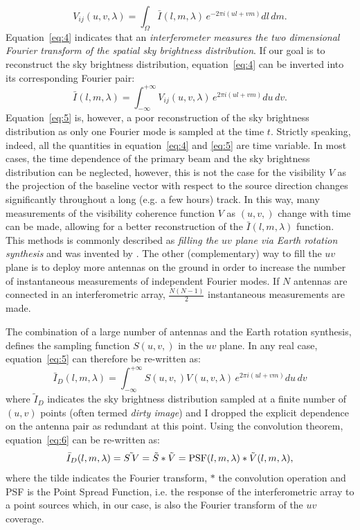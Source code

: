 \begin{equation}
V_{ij} (u,v, \lambda) = \int_\Omega {\bar I} (l, m, \lambda) \, e^{-2 \pi i (ul + vm)} dl \, dm.
\label{eq:4}
\end{equation}
Equation~\ref{eq:4} indicates that an {\it interferometer measures the two dimensional Fourier transform of the spatial sky brightness distribution}. If our goal is to reconstruct the sky brightness distribution, equation~\ref{eq:4} can be inverted into its corresponding Fourier pair:
\begin{equation}
{\bar I} (l, m, \lambda) = \int_{- \infty}^{+ \infty} V_{ij} (u,v, \lambda) \, e^{2 \pi i (ul + vm)} du \, dv.
\label{eq:5}
\end{equation}
Equation~\ref{eq:5} is, however, a poor reconstruction of the sky brightness distribution as only one Fourier mode is sampled at the time $t$. Strictly speaking, indeed, all the quantities in equation~\ref{eq:4} and \ref{eq:5} are time variable. In most cases, the time dependence of the primary beam and the sky brightness distribution can be neglected, however, this is not the case for the visibility $V$ as the projection of the baseline vector with respect to the source direction changes significantly throughout a long (e.g. a few hours) track. In this way, many measurements of the visibility coherence function $V$ as $(u,v,)$ change with time can be made, allowing for a better reconstruction of the ${\bar I} (l, m, \lambda)$ function. This methods is commonly described as {\it filling the $uv$ plane via Earth rotation synthesis} and was invented by \cite{ryle60}. The other (complementary) way to fill the $uv$ plane is to deploy more antennas on the ground in order to increase the number of instantaneous measurements of independent Fourier modes. If $N$ antennas are connected in an interferometric array, $\frac{N (N - 1)}{2}$ instantaneous measurements are made. 

The combination of a large number of antennas and the Earth rotation synthesis, defines the sampling function $S(u,v,)$ in the $uv$ plane. In any real case, equation~\ref{eq:5} can therefore be re-written as:
\begin{equation}
{\bar I}_D (l, m, \lambda) = \int_{- \infty}^{+ \infty} S(u,v,) V (u,v, \lambda) \, e^{2 \pi i (ul + vm)} du \, dv
\label{eq:6}
\end{equation}
where ${\tilde I}_D$ indicates the sky brightness distribution sampled at a finite number of $(u,v)$ points (often termed {\it dirty image}) and I dropped the explicit dependence on the antenna pair as redundant at this point. Using the convolution theorem, equation~\ref{eq:6} can be re-written as:
\begin{equation}
{\bar I}_D (l, m, \lambda)  =  \tilde{S \, V} =  {\tilde S} \ast {\tilde V} = {\rm PSF} (l, m, \lambda) \ast {\tilde V} (l, m, \lambda),
\label{eq:6}
\end{equation}
where the tilde indicates the Fourier transform, $\ast$ the convolution operation and {\rm PSF} is the Point Spread Function, i.e. the response of the interferometric array to a point sources which, in our case, is also the Fourier transform of the $uv$ coverage.

